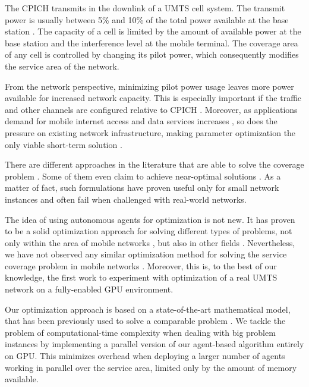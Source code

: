 The CPICH transmits in the downlink of a UMTS cell system. The transmit
power is usually between 5\% and 10\% of the total power available
at the base station \cite{Holma_WCDMA.for.UMTS:2005}. The capacity
of a cell is limited by the amount of available power at the base
station and the interference level at the mobile terminal. The coverage
area of any cell is controlled by changing its pilot power, which
consequently modifies the service area of the network.

From the network perspective, minimizing pilot power usage leaves
more power available for increased network capacity. This is especially
important if the traffic and other channels are configured relative
to CPICH \cite{Holma_WCDMA.for.UMTS:2005}. Moreover, as applications
demand for mobile internet access and data services increases \cite{Cunningham_Network.growth.theory.and.evidence:2010},
so does the pressure on existing network infrastructure, making parameter
optimization the only viable short-term solution \cite{Nawrocki_Understanding:2006}.

There are different approaches in the literature that are able to
solve the coverage problem \cite{Nawrocki_Understanding:2006,Siomina_Pilot.power.optimization:2004}.
Some of them even claim to achieve near-optimal solutions \cite{Siomina:Minimum.pilot.power.for.service.coverage}.
As a matter of fact, such formulations have proven useful only for
small network instances and often fail when challenged with real-world
networks.

The idea of using autonomous agents for optimization is not new. It
has proven to be a solid optimization approach for solving different
types of problems, not only within the area of mobile networks \cite{Esposito_Genetic.optimization.for.optimum.3G.network.planning:2010,Cheung_Realtime.video.using.agent.over.3G.networks:2005},
but also in other fields \cite{Vasile_Hybrid.multiagent.approach.for.optimization:2009,Valcarce_Applying.FDTD.to.the.coverage.prediction.of.WiMAX:2009}.
Nevertheless, we have not observed any similar optimization method
for solving the service coverage problem in mobile networks \cite{Benedicic_Pilot.power.optimization:2010}.
Moreover, this is, to the best of our knowledge, the first work to
experiment with optimization of a real UMTS network on a fully-enabled
GPU environment.

Our optimization approach is based on a state-of-the-art mathematical
model, that has been previously used to solve a comparable problem
\cite{Chen-Yuan_CPICH.optimization:2008}. We tackle the problem of
computational-time complexity when dealing with big problem instances
by implementing a parallel version of our agent-based algorithm entirely
on GPU. This minimizes overhead when deploying a larger number of
agents working in parallel over the service area, limited only by
the amount of memory available. 

